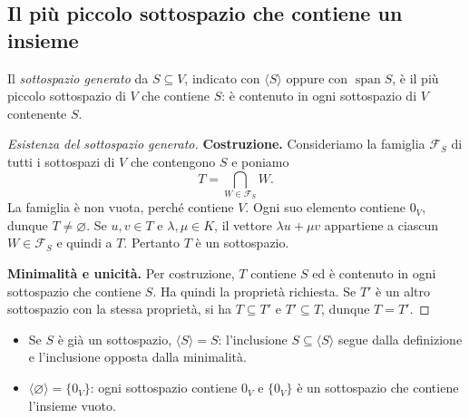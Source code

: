 \subsection{Il più piccolo sottospazio che contiene un insieme}

\begin{definizione}
Il \emph{sottospazio generato} da $S\subseteq V$, indicato con $\langle S\rangle$ oppure con $\operatorname{span}S$, è il più piccolo sottospazio di $V$ che contiene $S$: è contenuto in ogni sottospazio di $V$ contenente $S$.
\end{definizione}

\begin{proof}[Esistenza del sottospazio generato]
\textbf{Costruzione.} Consideriamo la famiglia $\mathcal F_S$ di tutti i sottospazi di $V$ che contengono $S$ e poniamo
\[
  T=\bigcap_{W\in\mathcal F_S}W.
\]
La famiglia è non vuota, perché contiene $V$. Ogni suo elemento contiene $0_V$, dunque $T\ne\varnothing$. Se $u,v\in T$ e $\lambda,\mu\in K$, il vettore $\lambda u+\mu v$ appartiene a ciascun $W\in\mathcal F_S$ e quindi a $T$. Pertanto $T$ è un sottospazio.

\textbf{Minimalità e unicità.} Per costruzione, $T$ contiene $S$ ed è contenuto in ogni sottospazio che contiene $S$. Ha quindi la proprietà richiesta. Se $T'$ è un altro sottospazio con la stessa proprietà, si ha $T\subseteq T'$ e $T'\subseteq T$, dunque $T=T'$.
\end{proof}

\begin{osservazione}
\leavevmode
\begin{itemize}
  \item Se $S$ è già un sottospazio, $\langle S\rangle=S$: l'inclusione $S\subseteq\langle S\rangle$ segue dalla definizione e l'inclusione opposta dalla minimalità.
  \item $\langle\varnothing\rangle=\{0_V\}$: ogni sottospazio contiene $0_V$ e $\{0_V\}$ è un sottospazio che contiene l'insieme vuoto.
\end{itemize}
\end{osservazione}
\begin{schema}
\end{schema}

